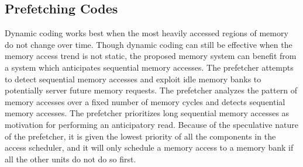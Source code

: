 {\color{blue}
\subsection{Prefetching Codes}
\label{sec:prefetching}
Dynamic coding works best when the most heavily accessed regions of memory do not change over time. Though dynamic coding can still be effective when the memory access trend is not static, the proposed memory system can benefit from a system which anticipates sequential memory accesses. 
The prefetcher attempts to detect sequential memory accesses and exploit idle memory banks to potentially server future memory requests. The prefetcher analyzes the pattern of memory accesses over a fixed number of memory cycles and detects sequential memory accesses. The prefetcher prioritizes long sequential memory accesses as motivation for performing an anticipatory read. Because of the speculative nature of the prefetcher, it is given the lowest priority of all the components in the access scheduler, and it will only schedule a memory access to a memory bank if all the other units do not do so first. 
} 
